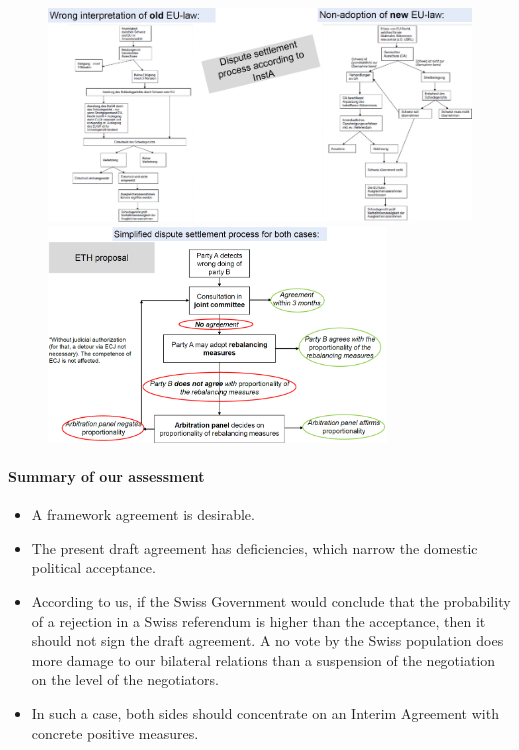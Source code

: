 \begin{figure}[h]
    \centering
    \includegraphics[width=\textwidth]{Pictures/dispute.png}

    \vspace{1\baselineskip}

    \includegraphics[width=0.8\textwidth]{Pictures/simplified_dispute.png}
\end{figure}


\paragraph{Summary of our assessment}
\begin{itemize}
    \item A framework agreement is desirable.
    \item The present draft agreement has deficiencies, which narrow the domestic
        political acceptance.
    \item According to us, if the Swiss Government would conclude that the
        probability of a rejection in a Swiss referendum is higher than the
        acceptance, then it should not sign the draft agreement. A no vote by
        the Swiss population does more damage to our bilateral relations than
        a suspension of the negotiation on the level of the negotiators.
    \item In such a case, both sides should concentrate on an Interim Agreement
        with concrete positive measures.
\end{itemize}

